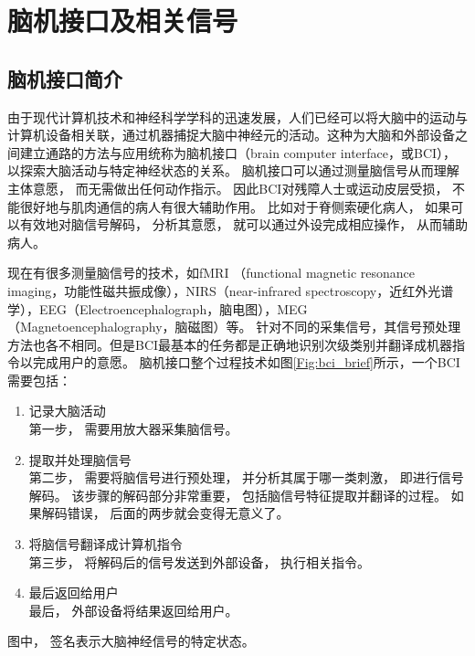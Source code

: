 \chapter{脑机接口及相关信号}

\section{脑机接口简介}

由于现代计算机技术和神经科学学科的迅速发展，人们已经可以将大脑中的运动与计算机设备相关联，通过机器捕捉大脑中神经元的活动\cite{wolpaw2002brain}。这种为大脑和外部设备之间建立通路的方法与应用统称为脑机接口（brain computer interface，或BCI）\cite{van2009brain,donoghue2002connecting}，以探索大脑活动与特定神经状态的关系。 脑机接口可以通过测量脑信号从而理解主体意愿， 而无需做出任何动作指示\cite{kostov2000parallel,allison2007brain,birbaumer2007brain}。 因此BCI对残障人士或运动皮层受损， 不能很好地与肌肉通信的病人有很大辅助作用。 比如对于脊侧索硬化\cite{allison2007brain}病人， 如果可以有效地对脑信号解码， 分析其意愿， 就可以通过外设完成相应操作， 从而辅助病人。 

现在有很多测量脑信号的技术，如fMRI （functional magnetic resonance imaging，功能性磁共振成像），NIRS（near-infrared spectroscopy，近红外光谱学），EEG（Electroencephalograph，脑电图），MEG（Magnetoencephalography，脑磁图）等。 针对不同的采集信号，其信号预处理方法也各不相同。但是BCI最基本的任务都是正确地识别次级类别并翻译成机器指令以完成用户的意愿。 脑机接口整个过程技术如图\ref{Fig:bci_brief}所示，一个BCI需要包括：

\begin{enumerate}
\item{记录大脑活动}\\
	第一步， 需要用放大器采集脑信号。 
\item{提取并处理脑信号}\\
	第二步， 需要将脑信号进行预处理， 并分析其属于哪一类刺激， 即进行信号解码。 该步骤的解码部分非常重要， 包括脑信号特征提取并翻译的过程。 如果解码错误， 后面的两步就会变得无意义了。
\item{将脑信号翻译成计算机指令}\\
	第三步， 将解码后的信号发送到外部设备， 执行相关指令。
\item{最后返回给用户}\\
	最后， 外部设备将结果返回给用户。
\end{enumerate}

图中， 签名表示大脑神经信号的特定状态。 

